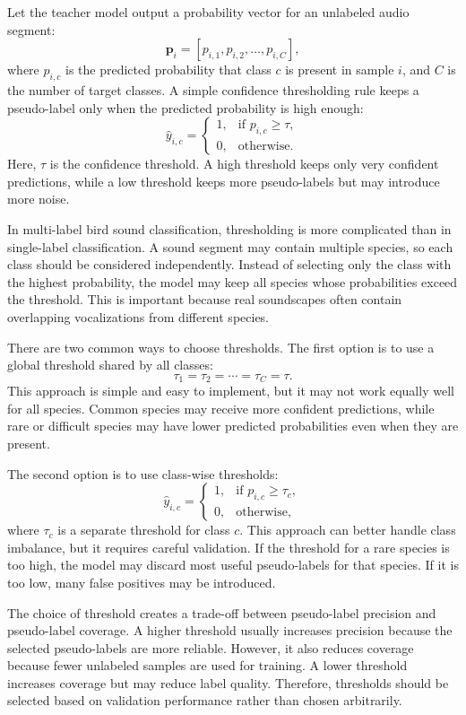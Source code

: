 \documentclass[a4paper,12pt]{article}
\begin{document}
Let the teacher model output a probability vector for an unlabeled audio segment:
\[
\mathbf{p}_i = [p_{i,1}, p_{i,2}, \ldots, p_{i,C}],
\]
where $p_{i,c}$ is the predicted probability that class $c$ is present in sample $i$, and $C$ is the number of target classes. A simple confidence thresholding rule keeps a pseudo-label only when the predicted probability is high enough:
\[
\hat{y}_{i,c} =
\begin{cases}
1, & \text{if } p_{i,c} \geq \tau,\\
0, & \text{otherwise}.
\end{cases}
\]
Here, $\tau$ is the confidence threshold. A high threshold keeps only very confident predictions, while a low threshold keeps more pseudo-labels but may introduce more noise.

In multi-label bird sound classification, thresholding is more complicated than in single-label classification. A sound segment may contain multiple species, so each class should be considered independently. Instead of selecting only the class with the highest probability, the model may keep all species whose probabilities exceed the threshold. This is important because real soundscapes often contain overlapping vocalizations from different species.

There are two common ways to choose thresholds. The first option is to use a global threshold shared by all classes:
\[
\tau_1 = \tau_2 = \cdots = \tau_C = \tau.
\]
This approach is simple and easy to implement, but it may not work equally well for all species. Common species may receive more confident predictions, while rare or difficult species may have lower predicted probabilities even when they are present.

The second option is to use class-wise thresholds:
\[
\hat{y}_{i,c} =
\begin{cases}
1, & \text{if } p_{i,c} \geq \tau_c,\\
0, & \text{otherwise},
\end{cases}
\]
where $\tau_c$ is a separate threshold for class $c$. This approach can better handle class imbalance, but it requires careful validation. If the threshold for a rare species is too high, the model may discard most useful pseudo-labels for that species. If it is too low, many false positives may be introduced.

The choice of threshold creates a trade-off between pseudo-label precision and pseudo-label coverage. A higher threshold usually increases precision because the selected pseudo-labels are more reliable. However, it also reduces coverage because fewer unlabeled samples are used for training. A lower threshold increases coverage but may reduce label quality. Therefore, thresholds should be selected based on validation performance rather than chosen arbitrarily.
\end{document}
